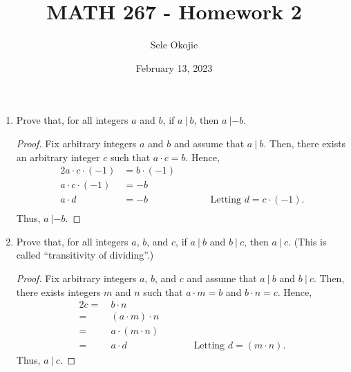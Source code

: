 \documentclass{article}
\title{MATH 267 - Homework 2}
\author{Sele Okojie}
\date{February 13, 2023}
\begin{document}
    \maketitle

    \begin{enumerate}
       
	\item Prove that, for all integers $a$ and $b$, if $a \ |\ b$, then $a\ |\minus b$.
            \begin{proof}
                Fix arbitrary integers $a$ and $b$ and assume that $a \ |\ b$. Then, there exists an arbitrary integer $c$ such that $a \cdot c = b$. Hence,
                \begin{alignat*}{2}
                    a \cdot c \cdot (\minus 1) &= b \cdot (\minus 1) \\
                    a \cdot c \cdot (\minus 1) &= \minus b \\
                    a \cdot d &= \minus b &\qquad &\textrm{Letting $d = c \cdot ( \minus 1)$.} \\
                \end{alignat*}
                Thus,  $a \ | \minus b$.
            \end{proof}

	\item Prove that, for all integers $a$, $b$, and $c$, if $a \ |\ b$ and $b \ |\ c$, then $a \ |\ c$.  (This is called ``transitivity of dividing''.)
            \begin{proof}
                Fix arbitrary integers $a$, $b$, and $c$ and assume that $a \ |\ b$ and $b \ |\ c$. Then, there exists integers $m$ and $n$ such that $a \cdot m = b$ and $b \cdot n = c$. Hence,
                \begin{alignat*}{2}
                    c = \ &b \cdot n \\
                    = \ &(a\cdot m) \cdot n \\
                    = \ &a \cdot (m \cdot n) \\
                    = \ &a \cdot d &\qquad &\textrm{Letting $d = (m \cdot n)$.}  
                \end{alignat*}
                Thus, $a \ | \ c$.
            \end{proof}


\end{enumerate}
\end{document}
